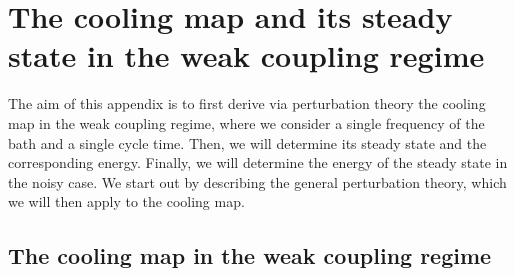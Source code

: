 \section{The cooling map and its steady state in the weak coupling regime}
\label{app:Single_freq steady state}

The aim of this appendix is to first derive via perturbation theory the cooling map in the weak coupling regime, where we consider a single frequency of the bath and a single cycle time. Then, we will determine its steady state and the corresponding energy. Finally, we will determine the energy of the steady state in the noisy case. We start out by describing the general perturbation theory, which we will then apply to the cooling map.

\subsection{The cooling map in the weak coupling regime}
\label{subapp:dyson_expansion_noiseless}

